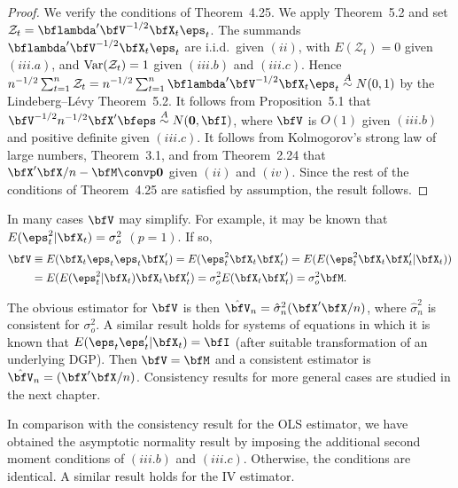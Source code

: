 \begin{proof}
We verify the conditions of Theorem~4.25. We apply Theorem~5.2 and set $\mathcal{Z}_t = \bflambda'\bfV^{-1/2}\bfX_t\eps_t$. The summands $\bflambda'\bfV^{-1/2}\bfX_t\eps_t$ are i.i.d.\ given $(ii)$, with $E(\mathcal{Z}_t) = 0$ given $(iii.a)$, and $\operatorname{Var}(\mathcal{Z}_t) = 1$ given $(iii.b)$ and $(iii.c)$. Hence $n^{-1/2}\sum_{t=1}^{n}\mathcal{Z}_t = n^{-1/2}\sum_{t=1}^{n}\bflambda'\bfV^{-1/2}\bfX_t\eps_t \overset{A}{\sim} N(0,1)$ by the Lindeberg--L\'{e}vy Theorem~5.2. It follows from Proposition~5.1 that $\bfV^{-1/2}n^{-1/2}\bfX'\bfeps \overset{A}{\sim} N(\mathbf{0},\bfI)$, where $\bfV$ is $O(1)$ given $(iii.b)$ and positive definite given $(iii.c)$. It follows from Kolmogorov's strong law of large numbers, Theorem~3.1, and from Theorem~2.24 that $\bfX'\bfX/n - \bfM \convp \mathbf{0}$ given $(ii)$ and $(iv)$. Since the rest of the conditions of Theorem~4.25 are satisfied by assumption, the result follows.
\end{proof}

In many cases $\bfV$ may simplify. For example, it may be known that $E(\eps_t^2|\bfX_t) = \sigma_o^2$ $(p = 1)$. If so,
\begin{align*}
\bfV &\equiv E(\bfX_t \eps_t \eps_t \bfX_t') = E(\eps_t^2 \bfX_t \bfX_t') = E(E(\eps_t^2 \bfX_t \bfX_t'|\bfX_t)) \\
&= E(E(\eps_t^2|\bfX_t)\bfX_t\bfX_t') = \sigma_o^2 E(\bfX_t\bfX_t') = \sigma_o^2 \bfM.
\end{align*}

The obvious estimator for $\bfV$ is then $\hat{\bfV}_n = \hat{\sigma}_n^2(\bfX'\bfX/n)$, where $\hat{\sigma}_n^2$ is consistent for $\sigma_o^2$. A similar result holds for systems of equations in which it is known that $E(\eps_t\eps_t'|\bfX_t) = \bfI$ (after suitable transformation of an underlying DGP). Then $\bfV = \bfM$ and a consistent estimator is $\hat{\bfV}_n = (\bfX'\bfX/n)$. Consistency results for more general cases are studied in the next chapter.

In comparison with the consistency result for the OLS estimator, we have obtained the asymptotic normality result by imposing the additional second moment conditions of $(iii.b)$ and $(iii.c)$. Otherwise, the conditions are identical. A similar result holds for the IV estimator.

